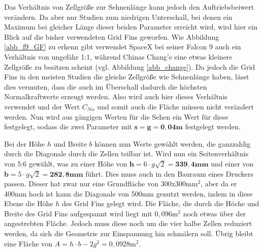 Das Verhältnis von Zellgröße zur Sehnenlänge kann jedoch den Auftriebsbeiwert verändern. Da aber nur Studien zum niedrigen Unterschall, bei denen ein Maximum bei gleicher Länge dieser beiden Parameter erreicht wird, wird hier ein Blick auf die bisher verwendeten Grid Fins geworfen. Wie Abbildung \ref{abb_f9_GF} zu erkenn gibt verwendet SpaceX bei seiner Falcon 9 auch ein Verhältnis von ungefähr 1:1, während Chinas Chang'e eine etwas kleinere Zellgröße zu besitzen scheint (vgl. Abbildung \ref{abb_change}). Da jedoch die Grid Fins in den meisten Studien die gleiche Zellgröße wie Sehnenlänge haben, lässt dies vermuten, dass die auch im Überschall dadurch die höchsten Normalkraftwerte erzeugt werden. Also wird auch hier dieses Verhältnis verwendet und der Wert $C_{N\alpha}$ und somit auch die Fläche müssen nicht verändert werden. Nun wird aus gängigen Werten für die Sehen ein Wert für diese festgelegt, sodass die zwei Parameter mit $\mathbf{s=g=0,04m}$ festgelegt werden.

Bei der Höhe $h$ und Breite $b$ können nun Werte gewählt werden, die ganzzahlig durch die Diagonale durch die Zellen teilbar ist. Wird nun ein Seitenverhältnis von 5:6 gewählt, was zu einer Höhe von $\mathbf{h= }6\cdot g\sqrt{2}=\mathbf{339,4mm}$ und einer von $\mathbf{b= }5\cdot g\sqrt{2}=\mathbf{282,8mm}$ führt. Dies muss auch in den Bauraum eines Druckers passen. Dieser hat zwar nur eine Grundfläche von 300x300mm$^2$, aber da er 400mm hoch ist kann die Diagonale von 500mm genutzt werden, indem in diese Ebene die Höhe $h$ des Grid Fins gelegt wird. Die Fläche, die durch die Höche und Breite des Grid Fins aufgespannt wird liegt mit $0,096\mathrm{m}^2$ noch etwas über der angestrebten Fläche. Jedoch muss diese noch um die vier halbe Zellen reduziert werden, da sich die Geometrie zur Einspannung hin schmälern soll. Übrig bleibt eine Fläche von $A=h\cdot b-2g^2=0,0928\mathrm{m}^2$.

